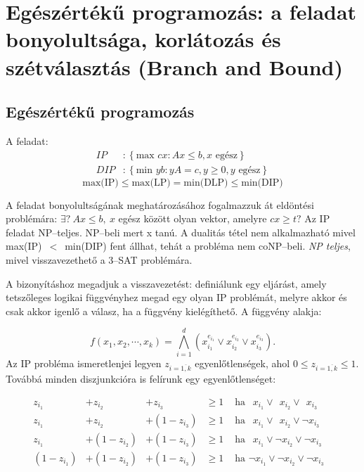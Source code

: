 \skiptooddpage
\section[Egészértékű programozás]{Egészértékű programozás: a feladat bonyolultsága, korlátozás és szétválasztás (Branch and Bound)}

\subsection{Egészértékű programozás}
A feladat:
\begin{align*}
IP &: \left\{\mbox{max }{cx: Ax \leq b, x \mbox{ egész}}\right\} \\
DIP &: \left\{ \mbox{min }{yb: yA=c, y \geq 0, y \mbox{ egész}}\right\}
\end{align*}
\[ \mbox{max(IP)} \leq \mbox{max(LP)}= \mbox{min(DLP)} \leq \mbox{min(DIP)} \]

A feladat bonyolultságának meghatározásához fogalmazzuk át eldöntési problémára:
$\exists?~Ax \leq b,~ x$ egész között olyan vektor, amelyre $cx \geq t?$ Az IP
feladat NP--teljes. NP--beli mert x tanú. A dualitás tétel nem alkalmazható
mivel max(IP)~$<$~min(DIP) fent állhat, tehát a probléma nem coNP--beli. \emph{NP
teljes}, mivel visszavezethető a $3$--SAT problémára.

A bizonyításhoz megadjuk a visszavezetést: definiálunk egy eljárást, amely tetszőleges
logikai függvényhez megad egy olyan IP problémát, melyre akkor és csak akkor igenlő a
válasz, ha a függvény kielégíthető. A függvény alakja:

\[ f(x_1, x_2, \cdots, x_k) = \bigwedge_{i=1}^{d}{\left( x_{i_1}^{e_{i_1}} \vee 
x_{i_2}^{e_{i_2}} \vee x_{i_3}^{e_{i_3}}\right).} 
\]
Az IP probléma ismeretlenjei legyen $z_{i=\overline{1,k}}$ egyenlőtlenségek, ahol 
$0 \leq z_{i=\overline{1,k}} \leq 1$. Továbbá minden diszjunkcióra is felírunk egy
egyenlőtlenséget:


\begin{align*}
z_{i_1} &+ z_{i_2} &+      z_{i_3}  &\geq 1 & \mbox{ ha }~~x_{i_1} \vee~~x_{i_2}\vee~~x_{i_3}& \\
z_{i_1} &+ z_{i_2} &+ (1 - z_{i_3}) &\geq 1 & \mbox{ ha }~~x_{i_1} \vee~~x_{i_2} \vee \neg x_{i_3}& \\
z_{i_1} &+ (1-z_{i_2}) &+ (1 - z_{i_3})  &\geq 1 & \mbox{ ha }~~x_{i_1} \vee \neg x_{i_2} \vee\neg x_{i_3}&\\
(1-z_{i_1}) &+ (1-z_{i_2}) &+ (1 - z_{i_3})  &\geq 1 & \mbox{ ha } \neg x_{i_1} \vee \neg x_{i_2} \vee \neg x_{i_3}&
\end{align*}

